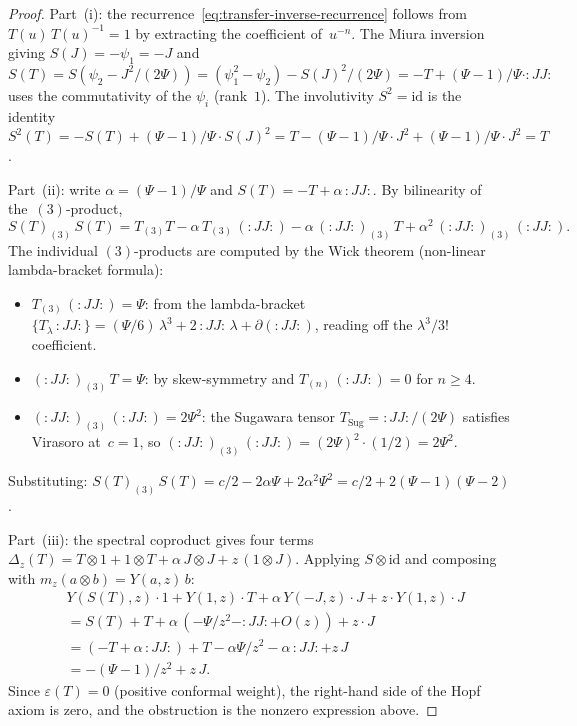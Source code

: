\begin{proof}
Part~(i): the recurrence~\eqref{eq:transfer-inverse-recurrence}
follows from $T(u)\, T(u)^{-1} = 1$ by extracting the
coefficient of~$u^{-n}$. The Miura inversion giving
$S(J) = -\psi_1 = -J$ and
$S(T) = S(\psi_2 - J^2/(2\Psi))
= (\psi_1^2 - \psi_2) - S(J)^2/(2\Psi)
= -T + (\Psi - 1)/\Psi \cdot {:}JJ{:}$
uses the commutativity of the $\psi_i$ (rank~$1$).
The involutivity $S^2 = \mathrm{id}$ is the identity
$S^2(T) = -S(T) + (\Psi-1)/\Psi \cdot S(J)^2
= T - (\Psi-1)/\Psi \cdot J^2
+ (\Psi-1)/\Psi \cdot J^2 = T$.

Part~(ii): write $\alpha = (\Psi - 1)/\Psi$
and $S(T) = -T + \alpha\,{:}JJ{:}$.
By bilinearity of the~$(3)$-product,
\[
 S(T)_{(3)}\, S(T)
 = T_{(3)}T
 - \alpha\, T_{(3)}\,({:}JJ{:})
 - \alpha\, ({:}JJ{:})_{(3)}\, T
 + \alpha^2\, ({:}JJ{:})_{(3)}\,({:}JJ{:}).
\]
The individual $(3)$-products are computed by the Wick
theorem (non-linear lambda-bracket formula):
\begin{itemize}
\item $T_{(3)}\,({:}JJ{:}) = \Psi$: from the
 lambda-bracket $\{T_\lambda\, {:}JJ{:}\}
 = (\Psi/6)\, \lambda^3 + 2\,{:}JJ{:}\,\lambda
 + \partial({:}JJ{:})$, reading off the
 $\lambda^3/3!$ coefficient.
\item $({:}JJ{:})_{(3)}\, T = \Psi$: by
 skew-symmetry and $T_{(n)}\,({:}JJ{:}) = 0$
 for $n \geq 4$.
\item $({:}JJ{:})_{(3)}\,({:}JJ{:}) = 2\Psi^2$:
 the Sugawara tensor
 $T_{\mathrm{Sug}} = {:}JJ{:}/(2\Psi)$
 satisfies Virasoro at~$c = 1$, so
 $({:}JJ{:})_{(3)}\,({:}JJ{:})
 = (2\Psi)^2 \cdot (1/2) = 2\Psi^2$.
\end{itemize}
Substituting:
$S(T)_{(3)}\, S(T)
= c/2 - 2\alpha\Psi + 2\alpha^2 \Psi^2
= c/2 + 2(\Psi - 1)(\Psi - 2)$.

Part~(iii): the spectral coproduct gives four terms
$\Delta_z(T) = T \otimes 1 + 1 \otimes T
+ \alpha\, J \otimes J + z\,(1 \otimes J)$.
Applying $S \otimes \mathrm{id}$ and composing with
$m_z(a \otimes b) = Y(a, z)\, b$:
\begin{align*}
 &Y(S(T), z) \cdot 1
 + Y(1, z) \cdot T
 + \alpha\, Y(-J, z) \cdot J
 + z \cdot Y(1, z) \cdot J \\
 &= S(T) + T
 + \alpha\,(-\Psi/z^2 - {:}JJ{:} + O(z))
 + z \cdot J \\
 &= (-T + \alpha\,{:}JJ{:}) + T
 - \alpha\Psi/z^2 - \alpha\,{:}JJ{:}
 + z\, J \\
 &= -(\Psi - 1)/z^2 + z\, J.
\end{align*}
Since $\varepsilon(T) = 0$ (positive conformal weight),
the right-hand side of the Hopf axiom is zero,
and the obstruction is the nonzero expression above.


\end{proof}
